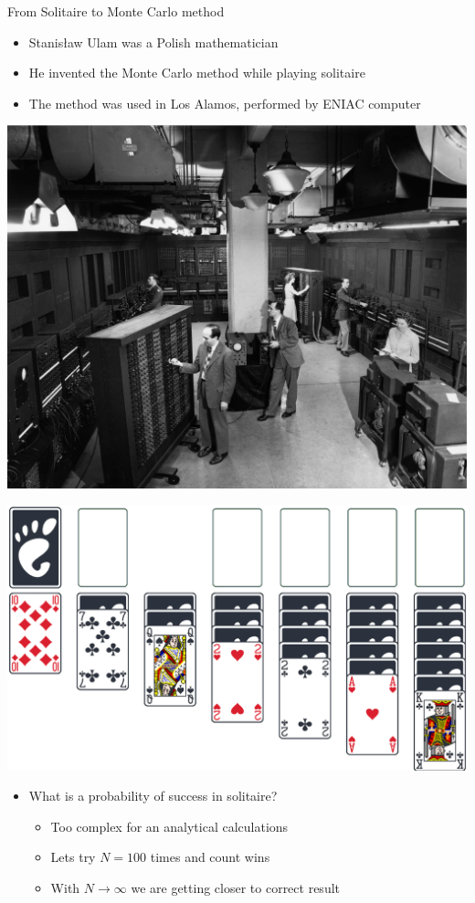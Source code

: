 \begin{wideslide}[toc = From Solitaire to MC]{From Solitaire to Monte Carlo method}
\null\vfill

    \twocolumn
    {
      \begin{itemize}
	\item Stanis{\l}aw Ulam was a Polish mathematician
	\item He invented the Monte Carlo method while playing solitaire
	\item The method was used in Los Alamos, performed by ENIAC computer
      \end{itemize}  
      
      \includegraphics[width=\columnwidth]{figures/eniac1946.eps}
    }
    {
      \includegraphics[width=\columnwidth]{figures/solitaire.eps}
      \begin{itemize}
	\item What is a probability of success in solitaire?
	\begin{itemize}
	  \item Too complex for an analytical calculations
	  \item Lets try $N = 100$ times and count wins
	  \item With $N \rightarrow \infty$ we are getting closer to correct result
	\end{itemize}
      \end{itemize}
    }
 
\vfill\null
\end{wideslide}

